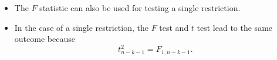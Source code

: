 \documentclass[notes=show,compress,beamer]{beamer}
\begin{document}
\begin{frame}%


\begin{itemize}
\item The $F$ statistic can also be used for testing a single restriction.%
\pause%

\item In the case of a single restriction, the $F$ test and $t$ test lead to
the 
\color{blue}%
same outcome 
\color{black}%
because 
\begin{equation*}
t_{n-k-1}^{2}=F_{1,n-k-1}.
\end{equation*}
\end{itemize}

\end{frame}%
\end{document}
